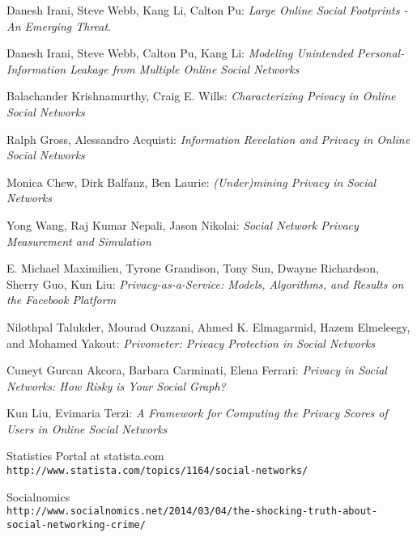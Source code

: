 \documentclass[11pt]{article}
\begin{document}
\begin{thebibliography}{9}
Danesh Irani, Steve Webb, Kang Li, Calton Pu: 
\textit{Large Online Social Footprints -An Emerging Threat}. 
 
Danesh Irani, Steve Webb, Calton Pu, Kang Li: 
\textit{Modeling Unintended Personal-Information Leakage from Multiple Online Social Networks}
 
Balachander Krishnamurthy, Craig E. Wills: 
\textit{Characterizing Privacy in Online Social Networks}

Ralph Gross, Alessandro Acquisti: 
\textit{Information Revelation and Privacy in Online Social Networks}

Monica Chew, Dirk Balfanz, Ben Laurie: 
\textit{(Under)mining Privacy in Social Networks}

Yong Wang, Raj Kumar Nepali, Jason Nikolai: 
\textit{Social Network Privacy Measurement and Simulation}

E. Michael Maximilien, Tyrone Grandison, Tony Sun, Dwayne Richardson, Sherry Guo, Kun Liu: 
\textit{Privacy-as-a-Service: Models, Algorithms, and Results on the Facebook Platform}

Nilothpal Talukder, Mourad Ouzzani, Ahmed K. Elmagarmid, Hazem Elmeleegy, and Mohamed Yakout: 
\textit{Privometer: Privacy Protection in Social Networks}

Cuneyt Gurcan Akcora, Barbara Carminati, Elena Ferrari: 
\textit{Privacy in Social Networks: How Risky is Your Social Graph?}

Kun Liu, Evimaria Terzi: 
\textit{A Framework for Computing the Privacy Scores of Users in Online Social Networks}

Statistics Portal at statista.com
\\\texttt{http://www.statista.com/topics/1164/social-networks/}

Socialnomics
\\\texttt{http://www.socialnomics.net/2014/03/04/the-shocking-truth-about-social-networking-crime/}

\end{thebibliography}

\newpage{}
\tableofcontents
\end{document}
